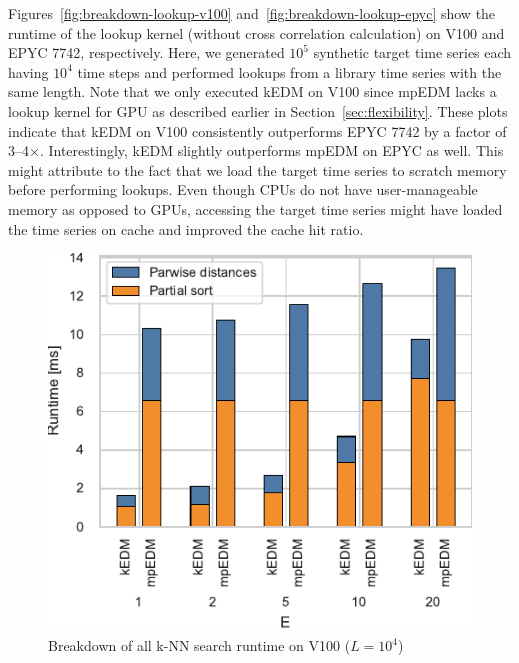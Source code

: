 \documentclass[sigconf]{acmart}
\begin{document}
Figures~\ref{fig:breakdown-lookup-v100} and~\ref{fig:breakdown-lookup-epyc}
show the runtime of the lookup kernel (without cross correlation calculation) on V100 and EPYC 7742, respectively.
Here, we generated $10^5$ synthetic target time series each having $10^4$ time
steps and performed lookups from a library time series with the same length.
Note that we only executed kEDM on
V100 since mpEDM lacks a lookup kernel for GPU as described earlier in
Section~\ref{sec:flexibility}. These plots indicate that kEDM on V100
consistently outperforms EPYC 7742 by a factor of 3--4$\times$.
Interestingly, kEDM slightly outperforms mpEDM on EPYC as well.
This might attribute to the fact that we load the target time series to scratch memory before performing lookups. Even though CPUs do not have user-manageable memory as opposed to GPUs, accessing the
target time series might have loaded the time series on cache and improved the
cache hit ratio.

\begin{figure}
    \centering
    \includegraphics[width=.80\linewidth]{figs/breakdown_knn_v100}
    \caption{Breakdown of all k-NN search runtime on V100 ($L=10^4$)}%
    \label{fig:breakdown-knn-v100}
\end{figure}
\end{document}
